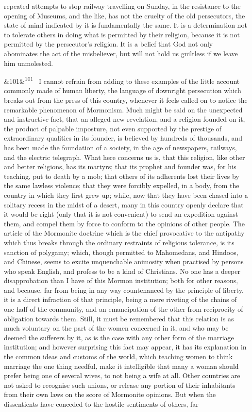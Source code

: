 \documentclass[12pt]{article}
\newcommand{\para}[1][]{\par\noindent\ifx&#1&\else\textsuperscript{\footnotesize #1}~\fi}
\begin{document}
repeated attempts to stop railway travelling on Sunday, in the resistance to the opening of Museums, and the like, has not the cruelty of the old persecutors, the state of mind indicated by it is fundamentally the same. It is a determination not to tolerate others in doing what is permitted by their religion, because it is not permitted by the persecutor's religion. It is a belief that God not only abominates the act of the misbeliever, but will not hold us guiltless if we leave him unmolested.

\para[101] I cannot refrain from adding to these examples of the little account commonly made of human liberty, the language of downright persecution which breaks out from the press of this country, whenever it feels called on to notice the remarkable phenomenon of Mormonism. Much might be said on the unexpected and instructive fact, that an alleged new revelation, and a religion founded on it, the product of palpable imposture, not even supported by the prestige of extraordinary qualities in its founder, is believed by hundreds of thousands, and has been made the foundation of a society, in the age of newspapers, railways, and the electric telegraph. What here concerns us is, that this religion, like other and better religions, has its martyrs; that its prophet and founder was, for his teaching, put to death by a mob; that others of its adherents lost their lives by the same lawless violence; that they were forcibly expelled, in a body, from the country in which they first grew up; while, now that they have been chased into a solitary recess in the midst of a desert, many in this country openly declare that it would be right (only that it is not convenient) to send an expedition against them, and compel them by force to conform to the opinions of other people. The article of the Mormonite doctrine which is the chief provocative to the antipathy which thus breaks through the ordinary restraints of religious tolerance, is its sanction of polygamy; which, though permitted to Mahomedans, and Hindoos, and Chinese, seems to excite unquenchable animosity when practised by persons who speak English, and profess to be a kind of Christians. No one has a deeper disapprobation than I have of this Mormon institution; both for other reasons, and because, far from being in any way countenanced by the principle of liberty, it is a direct infraction of that principle, being a mere riveting of the chains of one half of the community, and an emancipation of the other from reciprocity of obligation towards them. Still, it must be remembered that this relation is as much voluntary on the part of the women concerned in it, and who may be deemed the sufferers by it, as is the case with any other form of the marriage institution; and however surprising this fact may appear, it has its explanation in the common ideas and customs of the world, which teaching women to think marriage the one thing needful, make it intelligible that many a woman should prefer being one of several wives, to not being a wife at all. Other countries are not asked to recognise such unions, or release any portion of their inhabitants from their own laws on the score of Mormonite opinions. But when the dissentients have conceded to the hostile sentiments of others, far 
\end{document}
